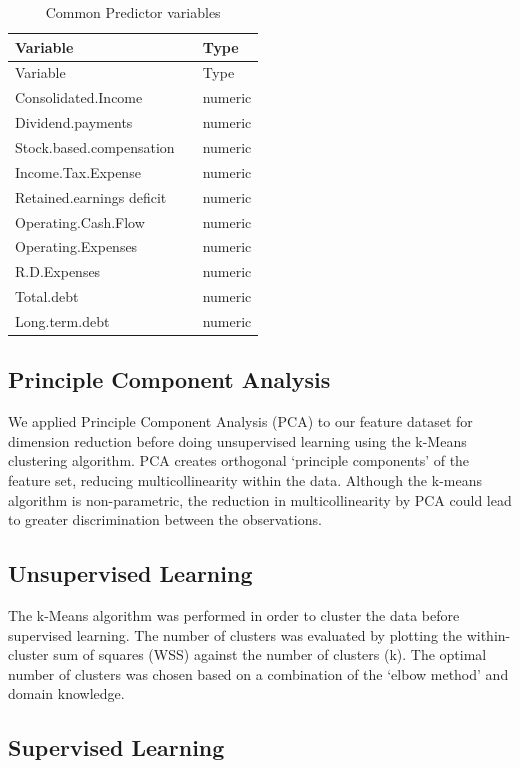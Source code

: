 \documentclass[11pt,]{article}
\begin{document}
\begin{longtable}[]{@{}lll@{}}
\caption{Common Predictor variables}\tabularnewline
\toprule
Variable & & Type\tabularnewline
\midrule
\endfirsthead
\toprule
Variable & & Type\tabularnewline
\midrule
\endhead
Consolidated.Income & & numeric\tabularnewline
Dividend.payments & & numeric\tabularnewline
Stock.based.compensation & & numeric\tabularnewline
Income.Tax.Expense & & numeric\tabularnewline
Retained.earnings deficit & & numeric\tabularnewline
Operating.Cash.Flow & & numeric\tabularnewline
Operating.Expenses & & numeric\tabularnewline
R.D.Expenses & & numeric\tabularnewline
Total.debt & & numeric\tabularnewline
Long.term.debt & & numeric\tabularnewline
\bottomrule
\end{longtable}

\hypertarget{principle-component-analysis}{%
\subsection{Principle Component
Analysis}\label{principle-component-analysis}}

We applied Principle Component Analysis (PCA) to our feature dataset for
dimension reduction before doing unsupervised learning using the k-Means
clustering algorithm. PCA creates orthogonal `principle components' of
the feature set, reducing multicollinearity within the data. Although
the k-means algorithm is non-parametric, the reduction in
multicollinearity by PCA could lead to greater discrimination between
the observations.

\hypertarget{unsupervised-learning}{%
\subsection{Unsupervised Learning}\label{unsupervised-learning}}

The k-Means algorithm was performed in order to cluster the data before
supervised learning. The number of clusters was evaluated by plotting
the within-cluster sum of squares (WSS) against the number of clusters
(k). The optimal number of clusters was chosen based on a combination of
the `elbow method' and domain knowledge.

\hypertarget{supervised-learning}{%
\subsection{Supervised Learning}\label{supervised-learning}}
\end{document}
